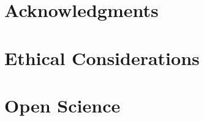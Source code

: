 \documentclass[letterpaper,twocolumn,10pt]{article}
\begin{document}

\ifanonymous
\else
\section*{Acknowledgments}

\fi

\appendix
\section*{Ethical Considerations}



\section*{Open Science}






\end{document}
